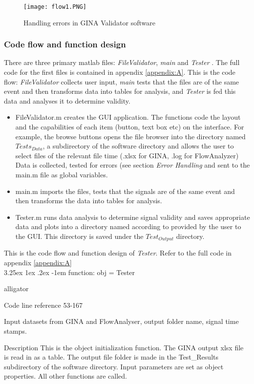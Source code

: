 \documentclass[12pt, openany, oneside]{book}
\makeatletter
\renewcommand\subparagraph{\@startsection{subparagraph}{6}{\parindent}%
  {3.25ex \@plus1ex \@minus .2ex}%
  {-1em}%
  {\normalfont\normalsize\bfseries}}
\makeatother
\begin{document}
\begin{landscape}
\begin{figure}
	\centering
		\texttt{[image: flow1.PNG]}		
		\caption{Handling errors in GINA Validator software}
		\label{fig:flow1}
\end{figure}
\end{landscape}

\subsubsection{Code flow and function design}
There are three primary matlab files: \textit{FileValidator}, \textit{main} and \textit{Tester} . The full code for the first files is contained in appendix \ref{appendix:A}.
This is the code flow: \textit{FileValidator} collects user input, \textit{main} tests that the files are of the same event and then transforms data into tables for analysis, and \textit{Tester} is fed this data and analyses it to determine validity. 
\begin{itemize}
	\item FileValidator.m creates the GUI application. The functions code the layout and the capabilities of each item (button, text box etc) on the interface. For example, the browse buttons opens the file browser into the directory named $Tests_{Data}$, a subdirectory of the software directory and allows the user to select files of the relevant file time (.xlsx for GINA, .log for FlowAnalyzer)
Data is collected, tested for errors (see section \textit{Error Handling} and sent to the main.m file as global variables. 
	\item main.m imports the files, tests that the signals are of the same event and then transforms the data into tables for analysis.
	\item	Tester.m runs data analysis to determine signal validity and saves appropriate data and plots into a directory named according to provided by the user to the GUI. This directory is saved under the $Test_{Output}$ directory. 
\end{itemize}

This is the code flow and function design of \textit{Tester}. Refer to the full code in appendix \ref{appendix:A} \\

\subparagraph{function: obj = Tester}
\begin{labeling}{alligator}
\item[Code line reference] 53-167
\item[Input] datasets from GINA and FlowAnalyser, output folder name, signal time stamps.
\item[Description] This is the object initialization function. The GINA output xlsx file is read in as a table. The output file folder is made in the Test\_Results subdirectory of the software directory. Input parameters are set as object properties. All other functions are called.
\end{labeling}
\end{document}
